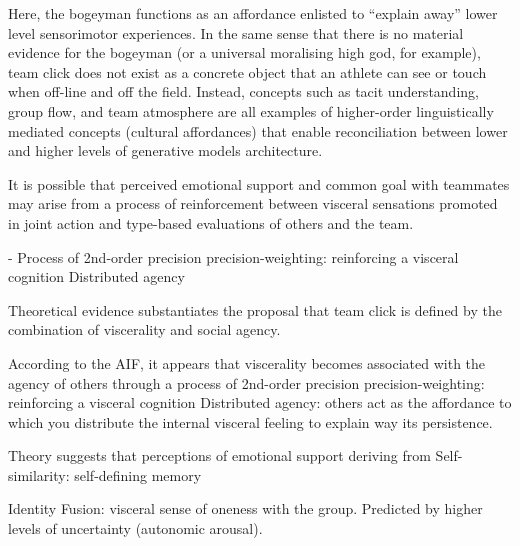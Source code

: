\begin{CJK}{UTF8}{gbsn}
Here, the bogeyman functions as an affordance enlisted to ``explain away'' lower level sensorimotor experiences.  In the same sense that there is no material evidence for the bogeyman (or a universal moralising high god, for example), team click does not exist as a concrete object that an athlete can see or touch when off-line and off the field.  Instead, concepts such as tacit understanding, group flow, and team atmosphere are all examples of higher-order linguistically mediated concepts (cultural affordances) that enable reconciliation between lower and higher levels of generative models architecture.


It is possible that perceived emotional support and common goal with teammates may arise from a process of reinforcement between
visceral sensations promoted in joint action and type-based evaluations of others and the team.


- Process of 2nd-order precision precision-weighting: reinforcing a visceral cognition
Distributed agency

Theoretical evidence substantiates the proposal that team click is defined by the combination of viscerality and social agency.


According to the AIF, it appears that viscerality becomes associated with the agency of others through a process of 2nd-order precision precision-weighting: reinforcing a visceral cognition
Distributed agency: others act as the affordance to which you distribute the internal visceral feeling to explain way its persistence.


Theory suggests that perceptions of emotional support deriving from
Self-similarity: self-defining memory


Identity Fusion: visceral sense of oneness with the group.
Predicted by higher levels of uncertainty (autonomic arousal).




\end{CJK}
